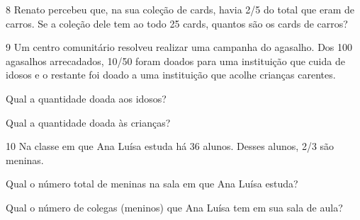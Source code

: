 
\pagebreak
\num{8} Renato percebeu que, na sua coleção de cards, havia 2/5 do total que eram de carros. Se a coleção dele tem ao todo 25 cards,
quantos são os cards de carros?

\begin{emptybox}


\bigskip
\bigskip
\end{emptybox}

\num{9} Um centro comunitário resolveu realizar uma campanha do agasalho.
Dos 100 agasalhos arrecadados, 10/50 foram doados para uma instituição
que cuida de idosos e o restante foi doado a uma instituição que acolhe
crianças carentes.

\begin{escolha}
\item
  Qual a quantidade doada aos idosos?

\begin{emptybox}
\bigskip
\bigskip
\end{emptybox}

\item
  Qual a quantidade doada às crianças?

\begin{emptybox}
\bigskip
\bigskip
\end{emptybox}
\end{escolha}

\num{10} Na classe em que Ana Luísa estuda há 36 alunos. Desses alunos, 2/3 são meninas.

\begin{escolha}
\item
  Qual o número total de meninas na sala em que Ana Luísa estuda?

\begin{emptybox}
\bigskip
\end{emptybox}

\item
  Qual o número de colegas (meninos) que Ana Luísa tem em sua sala de aula?

\begin{emptybox}
\bigskip
\end{emptybox}
\end{escolha}

